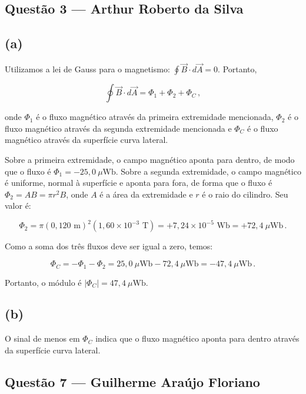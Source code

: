 \documentclass[12pt,a4paper]{article}
\begin{document}
\subsection{Questão 3 — Arthur Roberto da Silva}
\subsection*{(a)}
Utilizamos a lei de Gauss para o magnetismo: $\oint \vec{B} \cdot d\vec{A} = 0$. Portanto,

\begin{equation*}
\oint \vec{B} \cdot d\vec{A} = \Phi_1 + \Phi_2 + \Phi_C \,,
\end{equation*}

\noindent onde $\Phi_1$ é o fluxo magnético através da primeira extremidade mencionada, $\Phi_2$ é o fluxo magnético através da segunda extremidade mencionada e $\Phi_C$ é o fluxo magnético através da superfície curva lateral. 

Sobre a primeira extremidade, o campo magnético aponta para dentro, de modo que o fluxo é $\Phi_1 = -25,0\ \mu\text{Wb}$. Sobre a segunda extremidade, o campo magnético é uniforme, normal à superfície e aponta para fora, de forma que o fluxo é $\Phi_2 = AB = \pi r^2 B$, onde $A$ é a área da extremidade e $r$ é o raio do cilindro. Seu valor é:

\begin{equation*}
\Phi_2 = \pi (0,120\text{ m})^2 (1,60 \times 10^{-3}\text{ T}) = +7,24 \times 10^{-5}\text{ Wb} = +72,4\ \mu\text{Wb} \,.
\end{equation*}

Como a soma dos três fluxos deve ser igual a zero, temos:

\begin{equation*}
\Phi_C = -\Phi_1 - \Phi_2 = 25,0\ \mu\text{Wb} - 72,4\ \mu\text{Wb} = -47,4\ \mu\text{Wb} \,.
\end{equation*}

Portanto, o módulo é $|\Phi_C| = 47,4\ \mu\text{Wb}$.

\subsection*{(b)}
O sinal de menos em $\Phi_C$ indica que o fluxo magnético aponta para dentro através da superfície curva lateral.

\subsection{Questão 7 — Guilherme Araújo Floriano}
\end{document}
